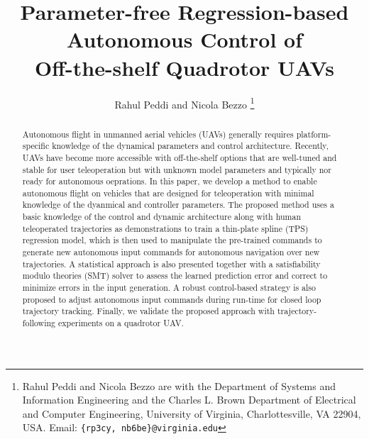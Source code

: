 \documentclass[letterpaper, 10 pt, conference]{ieeeconf}  %
\begin{document}
\title{\LARGE \bf
Parameter-free Regression-based Autonomous Control of \\Off-the-shelf Quadrotor UAVs
}


\author{Rahul Peddi and Nicola Bezzo%
\thanks{Rahul Peddi and Nicola Bezzo are with the Department of Systems and Information Engineering and the Charles L. Brown Department of Electrical and Computer Engineering, University of Virginia, Charlottesville, VA 22904, USA. Email: {\tt \{rp3cy, nb6be\}@virginia.edu}}}



\maketitle
\thispagestyle{empty}
\pagestyle{empty}


\begin{abstract}
Autonomous flight in unmanned aerial vehicles (UAVs) generally requires platform-specific knowledge of the dynamical parameters and control architecture. Recently, UAVs have become more accessible with off-the-shelf options that are well-tuned and stable for user teleoperation but with unknown model parameters and typically nor ready for autonomous oeprations. In this paper, we develop a method to enable autonomous flight on vehicles that are designed for teleoperation with minimal knowledge of the dyanmical and controller parameters. The proposed method uses a basic knowledge of the control and dynamic architecture along with human teleoperated trajectories as demonstrations to train a thin-plate spline (TPS) regression model, which is then used to manipulate the pre-trained commands to generate new autonomous input commands for autonomous navigation over new trajectories. A statistical approach is also presented together with a satisfiability modulo theories (SMT) solver to assess the learned prediction error and correct to minimize errors in the input generation. A robust control-based strategy is also proposed to adjust autonomous input commands during run-time for closed loop trajectory tracking. Finally, we validate the proposed approach with trajectory-following experiments on a quadrotor UAV.

\end{abstract}


\end{document}

